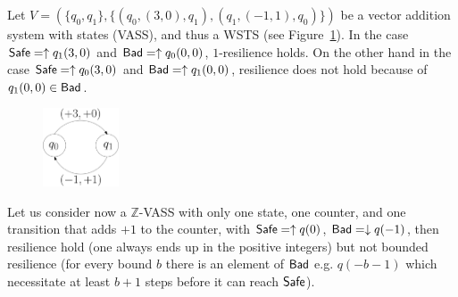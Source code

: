 \fi

\begin{example}
Let $V = (\{q_0,q_1\}, \{ (q_0, (3,0), q_1), (q_1, (-1,1), q_0)\})$ be a vector addition system with states (VASS),
and thus a WSTS (see Figure~\ref{example_1}).
In the case $\textsf{Safe} = \uparrow q_1(3,0)$ and $\textsf{Bad} = \uparrow q_0(0,0)$, $1$-resilience holds.
On the other hand in the case $\textsf{Safe} = \uparrow q_0(3,0)$ and $\textsf{Bad} = \uparrow q_1(0,0)$, resilience does not hold because of $q_1(0,0) \in \textsf{Bad}$.
\end{example}

\begin{center}
	\begin{figure}
			\hspace{3.75cm}
				\label{example_1}
\includegraphics[width=0.2\textwidth]{FigureA}
	\caption{}
	\end{figure}
\end{center}






\begin{example}
Let us consider now a $\mathds{Z}$-VASS with only one state, one counter, and one transition that adds $+1$ to the counter, with $\textsf{Safe} = \uparrow q(0)$, $\textsf{Bad} = \downarrow q(-1)$,
then resilience hold (one always ends up in the positive integers) but not bounded resilience
(for every bound $b$ there is an element of $\textsf{Bad}$ e.g. $q(-b-1)$ which necessitate at least $b+1$ steps before it can reach $\textsf{Safe}$). 
\end{example}




